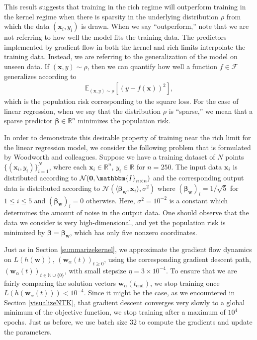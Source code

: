 \documentclass{article}
\begin{document}
This result suggests that training in the rich regime will outperform training in the kernel regime when there is sparsity in the underlying distribution $\rho$ from which the data $(\boldsymbol{x}_i, y_i)$ is drawn. When we say \enquote{outperform,} note that we are not referring to how well the model fits the training data. The predictors implemented by gradient flow in both the kernel and rich limits interpolate the training data. Instead, we are referring to the generalization of the model on unseen data. If $(\boldsymbol{x}, y) \sim \rho$, then we can quantify how well a function $f \in \mathcal{F}$ generalizes according to
\begin{align}\label{poprisk}
\mathbb{E}_{(\boldsymbol{x}, y) \sim \rho}[(y - f(\boldsymbol{x}))^2],
\end{align}
which is the population risk corresponding to the square loss. For the case of linear regression, when we say that the distribution $\rho$ is \enquote{sparse,} we mean that a sparse predictor $\boldsymbol{\beta} \in \mathbb{R}^n$ minimizes the population risk.

In order to demonstrate this desirable property of training near the rich limit for the linear regression model, we consider the following problem that is formulated by Woodworth and colleagues. Suppose we have a training dataset of $N$ points $\{(\boldsymbol{x}_i, y_i)\}_{i=1}^N$, where each $\boldsymbol{x}_i \in \mathbb{R}^n$, $y_i \in \mathbb{R}$ for $n = 250$. The input data $\boldsymbol{x}_i$ is distributed according to $\mathcal{N}(\boldsymbol{0},\mathbbm{I}_{n \times n})$ and the corresponding output data is distributed according to $\mathcal{N}(\langle \boldsymbol{\beta}_{\boldsymbol{w}}, \boldsymbol{x}_i \rangle, \sigma^2)$ where $(\boldsymbol{\beta}_{\boldsymbol{w}})_i = 1/\sqrt{5}$ for $1 \leq i \leq 5$ and $(\boldsymbol{\beta}_{\boldsymbol{w}})_i = 0$ otherwise. Here, $\sigma^2 = 10^{-2}$ is a constant which determines the amount of noise in the output data. One should observe that the data we consider is very high-dimensional, and yet the population risk is minimized by $\boldsymbol{\beta} = \boldsymbol{\beta}_{\boldsymbol{w}}$, which has only five nonzero coordinates.

Just as in Section \ref{summarizekernel}, we approximate the gradient flow dynamics on $L(h(\boldsymbol{w}))$, $(\boldsymbol{w}_{\alpha}(t))_{t \geq 0}$, using the corresponding gradient descent path, $(\boldsymbol{w}_{\alpha}(t))_{t \in \mathbb{N} \cup \{ 0\}}$, with small stepsize $\eta = 3 \times 10^{-4}$. To ensure that we are fairly comparing the solution vectors $\boldsymbol{w}_{\alpha}(t_{\text{end}})$, we stop training once $L(h(\boldsymbol{w}_{\alpha}(t))) < 10^{-4}$. Since it might be the case, as we encountered in Section \ref{visualizeNTK}, that gradient descent converges very slowly to a global minimum of the objective function, we stop training after a maximum of $10^4$ epochs. Just as before, we use batch size 32 to compute the gradients and update the parameters.
\end{document}
